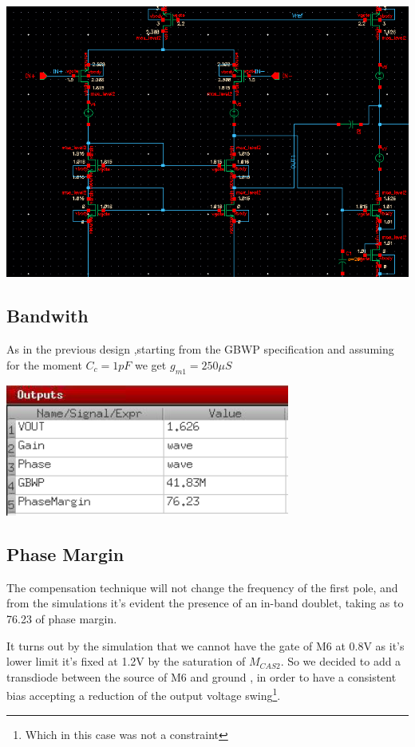 \centering
\includegraphics[width=1\textwidth]{Capitoli/dc.png}
\raggedright


\subsection{Bandwith} %
\label{sub:bandwith}

As in the previous design ,starting from the GBWP specification and assuming for the moment $C_c=1pF$ we get $g_{m1}= 250 \mu S$ 

\centering
\includegraphics[width=0.7\textwidth]{Capitoli/gnp.png}

\raggedright




\subsection{Phase Margin} %
\label{sub:phase_margin}

The compensation technique will not change the frequency of the first pole, and from the simulations it's evident the presence of an in-band doublet, taking as to 76.23 of phase margin.


It turns out by the simulation that we cannot have the gate of M6 at 0.8V as it's lower limit it's fixed at 1.2V by the saturation of $M_{CAS2}$.
So we decided to add a transdiode between the source of M6 and ground , in order to have a consistent bias accepting a reduction of the output voltage swing\footnote{Which in this case was not a constraint}.

